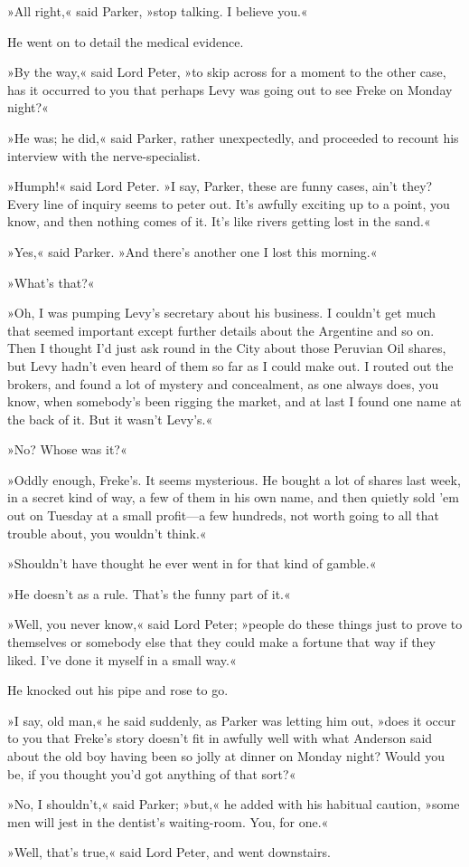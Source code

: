 »All right,« said Parker, »stop talking. I believe you.«

He went on to detail the medical evidence.

»By the way,« said Lord Peter, »to skip across for a moment to the other case, has it occurred to you that perhaps Levy was going out to see Freke on Monday night?«

»He was; he did,« said Parker, rather unexpectedly, and proceeded to recount his interview with the nerve-specialist.

»Humph!« said Lord Peter. »I say, Parker, these are funny cases, ain't they? Every line of inquiry seems to peter out. It's awfully exciting up to a point, you know, and then nothing comes of it. It's like rivers getting lost in the sand.«

»Yes,« said Parker. »And there's another one I lost this morning.«

»What's that?«

»Oh, I was pumping Levy's secretary about his business. I couldn't get much that seemed important except further details about the Argentine and so on. Then I thought I'd just ask round in the City about those Peruvian Oil shares, but Levy hadn't even heard of them so far as I could make out. I routed out the brokers, and found a lot of mystery and concealment, as one always does, you know, when somebody's been rigging the market, and at last I found one name at the back of it. But it wasn't Levy's.«

»No? Whose was it?«

»Oddly enough, Freke's. It seems mysterious. He bought a lot of shares last week, in a secret kind of way, a few of them in his own name, and then quietly sold 'em out on Tuesday at a small profit\allowbreak---\allowbreak a few hundreds, not worth going to all that trouble about, you wouldn't think.«

»Shouldn't have thought he ever went in for that kind of gamble.«

»He doesn't as a rule. That's the funny part of it.«

»Well, you never know,« said Lord Peter; »people do these things just to prove to themselves or somebody else that they could make a fortune that way if they liked. I've done it myself in a small way.«

He knocked out his pipe and rose to go.

»I say, old man,« he said suddenly, as Parker was letting him out, »does it occur to you that Freke's story doesn't fit in awfully well with what Anderson said about the old boy having been so jolly at dinner on Monday night? Would you be, if you thought you'd got anything of that sort?«

»No, I shouldn't,« said Parker; »but,« he added with his habitual caution, »some men will jest in the dentist's waiting-room. You, for one.«

»Well, that's true,« said Lord Peter, and went downstairs.
